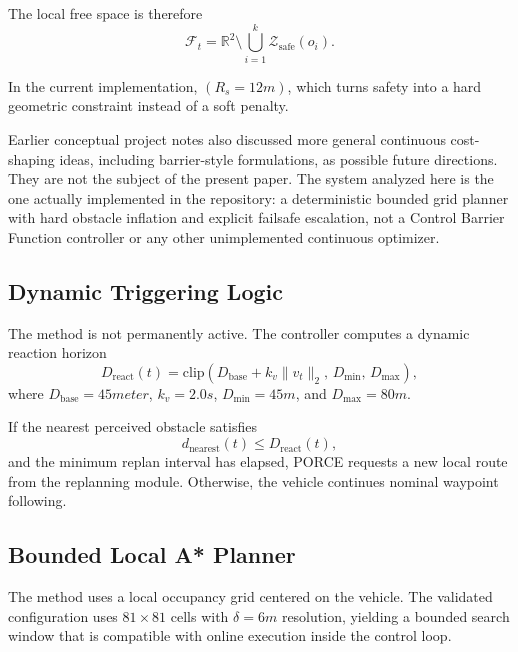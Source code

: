 \documentclass[drones,article,submit,moreauthors]{Definitions/mdpi}
\begin{document}
The local free space is therefore
\begin{equation}
    \mathcal{F}_t = \mathbb{R}^2 \setminus \bigcup_{i=1}^{k} \mathcal{Z}_{\mathrm{safe}}(o_i).
\end{equation}

In the current implementation, $(R_s = 12 m)$, which turns safety into a hard geometric constraint instead of a soft penalty.

Earlier conceptual project notes also discussed more general continuous cost-shaping ideas, including barrier-style formulations, as possible future directions. They are not the subject of the present paper. The system analyzed here is the one actually implemented in the repository: a deterministic bounded grid planner with hard obstacle inflation and explicit failsafe escalation, not a Control Barrier Function controller or any other unimplemented continuous optimizer.

\subsection{Dynamic Triggering Logic}

The method is not permanently active. The controller computes a dynamic reaction horizon
\begin{equation}
    D_{\mathrm{react}}(t) =
    \mathrm{clip}\!\left(D_{\mathrm{base}} + k_v \lVert v_t \rVert_2,\,
    D_{\min},\, D_{\max}\right),
\end{equation}
where $D_{\mathrm{base}}=45 meter$, $k_v= 2.0 s$, $D_{\min}=45 m$, and $D_{\max}=80 m$.

If the nearest perceived obstacle satisfies
\begin{equation}
    d_{\mathrm{nearest}}(t) \le D_{\mathrm{react}}(t),
\end{equation}
and the minimum replan interval has elapsed, PORCE requests a new local route from the replanning module. Otherwise, the vehicle continues nominal waypoint following.

\subsection{Bounded Local A* Planner}

The method uses a local occupancy grid centered on the vehicle. The validated configuration uses \(81 \times 81\) cells with $\delta=6 m$ resolution, yielding a bounded search window that is compatible with online execution inside the control loop.
\end{document}
